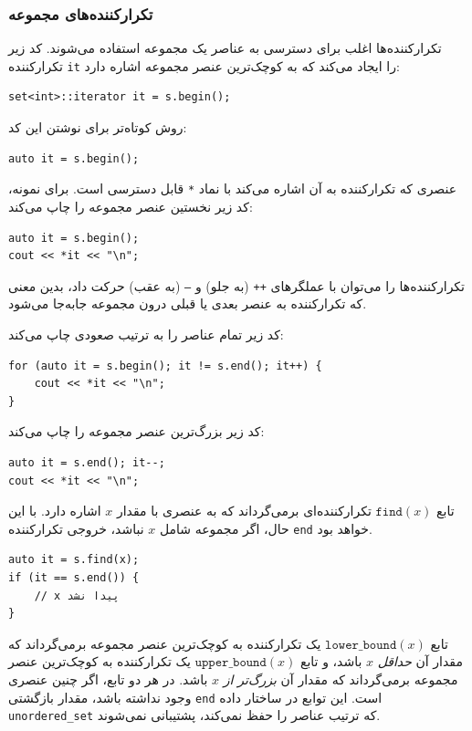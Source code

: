 \subsubsection{تکرارکننده‌های مجموعه}

تکرارکننده‌ها اغلب برای دسترسی به عناصر یک مجموعه استفاده می‌شوند.
کد زیر تکرارکننده \texttt{it} را ایجاد می‌کند که به کوچک‌ترین عنصر مجموعه اشاره دارد:
\begin{lstlisting}
set<int>::iterator it = s.begin();
\end{lstlisting}
روش کوتاه‌تر برای نوشتن این کد:
\begin{lstlisting}
auto it = s.begin();
\end{lstlisting}
عنصری که تکرارکننده به آن اشاره می‌کند با نماد \texttt{*} قابل دسترسی است.
برای نمونه، کد زیر نخستین عنصر مجموعه را چاپ می‌کند:

\begin{lstlisting}
auto it = s.begin();
cout << *it << "\n";
\end{lstlisting}

تکرارکننده‌ها را می‌توان با عملگرهای \texttt{++} (به جلو) و \texttt{--} (به عقب) حرکت داد،
بدین معنی که تکرارکننده به عنصر بعدی یا قبلی درون مجموعه جابه‌جا می‌شود.

کد زیر تمام عناصر را به ترتیب صعودی چاپ می‌کند:
\begin{lstlisting}
for (auto it = s.begin(); it != s.end(); it++) {
    cout << *it << "\n";
}
\end{lstlisting}
کد زیر بزرگ‌ترین عنصر مجموعه را چاپ می‌کند:
\begin{lstlisting}
auto it = s.end(); it--;
cout << *it << "\n";
\end{lstlisting}

تابع $\texttt{find}(x)$ تکرارکننده‌ای برمی‌گرداند که به عنصری با مقدار $x$ اشاره دارد.
با این حال، اگر مجموعه شامل $x$ نباشد، خروجی تکرارکننده \texttt{end} خواهد بود.

\begin{lstlisting}
auto it = s.find(x);
if (it == s.end()) {
    // x پیدا نشد
}
\end{lstlisting}

تابع $\texttt{lower\_bound}(x)$ یک تکرارکننده به کوچک‌ترین عنصر مجموعه برمی‌گرداند که مقدار آن \emph{حداقل} $x$ باشد، و تابع $\texttt{upper\_bound}(x)$ یک تکرارکننده به کوچک‌ترین عنصر مجموعه برمی‌گرداند که مقدار آن \emph{بزرگ‌تر از} $x$ باشد. در هر دو تابع، اگر چنین عنصری وجود نداشته باشد، مقدار بازگشتی \texttt{end} است. این توابع در ساختار داده \texttt{unordered\_set} که ترتیب عناصر را حفظ نمی‌کند، پشتیبانی نمی‌شوند.

